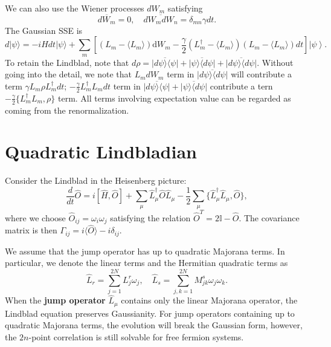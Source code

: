 \documentclass[aps,prx,superscriptaddress,nofootinbib]{revtex4}
\begin{document}
We can also use the Wiener processes $dW_m$ satisfying 
$$\overline{dW_m} = 0,\quad \overline{dW_m dW_n} = \delta_{mn} \gamma dt.$$
The Gaussian SSE is
\begin{equation}
	d |\psi\rangle = -i H dt |\psi\rangle + 
	\sum_m \left[\left(L_m-\langle L_m\rangle\right) \mathrm{d} W_{m}-\frac{\gamma}{2}\left(L_m^\dagger-\langle L_m\rangle\right)\left(L_m-\langle L_m\rangle\right) dt\right]\left|\psi\right\rangle.
\end{equation}
To retain the Lindblad, note that $d\rho = \overline{|d\psi\rangle\langle\psi|} + \overline{|\psi\rangle \langle d\psi|}+ \overline{|d\psi\rangle\langle d\psi|}$.
Without going into the detail, we note that $L_m dW_m$ term in $\overline{|d\psi\rangle\langle d\psi|}$ will contribute a term $\gamma L_m \rho L_m^\dagger dt$; $-\frac{\gamma}{2}L_m^\dagger L_m dt$ term in $\overline{|d\psi\rangle\langle\psi|} + \overline{|\psi\rangle \langle d\psi|}$ contribute a tern $-\frac{\gamma}{2}\{L_m^\dagger L_m, \rho\}$ term. All terms involving expectation value can be regarded as coming from the renormalization.



\section{Quadratic Lindbladian}

Consider the Lindblad in the Heisenberg picture:
\begin{equation}
	\frac{d}{dt} \hat O
	= i[\hat H, \hat O] + \sum_\mu \hat L_\mu^\dagger \hat O\hat L_\mu - \frac{1}{2} \sum_\mu\{\hat L_\mu^\dagger \hat L_\mu, \hat O \},
\end{equation}
where we choose $\hat O_{ij} = \omega_i\omega_j$ satisfying the relation $\hat O^T = 2\mathbb I - \hat O$. The covariance matrix is then $\Gamma_{ij} = i\langle \hat O\rangle - i\delta_{ij}$.

We assume that the jump operator has up to quadratic Majorana terms. In particular, we denote the linear terms and the Hermitian quadratic terms as
$$
	\hat L_r = \sum_{j=1}^{2N} L^r_{j} \omega_j, \quad
	\hat L_s = \sum_{j,k=1}^{2N} M^s_{jk} \omega_j \omega_k.
$$
When the \textbf{jump operator} $\hat L_\mu$ contains only the linear Majorana operator, the Lindblad equation preserves Gaussianity. For jump operators containing up to quadratic Majorana terms, the evolution will break the Gaussian form, however, the $2n$-point correlation is still solvable for free fermion systems.
\end{document}
